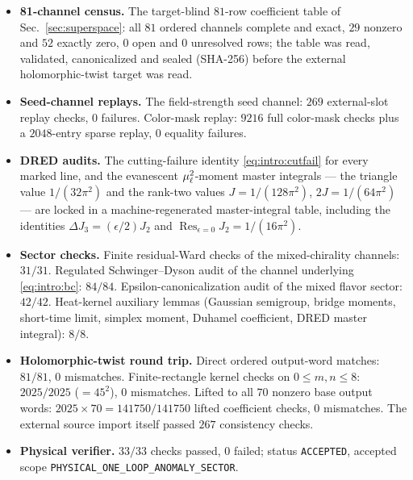 \begin{itemize}[leftmargin=1.6em]

\item \textbf{81-channel census.} The target-blind $81$-row coefficient table of Sec.~\ref{sec:superspace}: all $81$
ordered channels complete and exact, $29$ nonzero and $52$ exactly zero, $0$ open and $0$ unresolved rows; the table was
read, validated, canonicalized and sealed (SHA-256) before the external holomorphic-twist target was read.

\item \textbf{Seed-channel replays.} The field-strength seed channel: $269$ external-slot replay checks, $0$ failures.
Color-mask replay: $9216$ full color-mask checks plus a $2048$-entry sparse replay, $0$ equality failures.

\item \textbf{DRED audits.} The cutting-failure identity \eqref{eq:intro:cutfail} for every marked line, and the
evanescent $\mu_\ell^2$-moment master integrals --- the triangle value $1/(32\pi^2)$ and the rank-two values
$J=1/(128\pi^2)$, $2J=1/(64\pi^2)$ --- are locked in a machine-regenerated master-integral table, including the
identities $\Delta J_3=(\epsilon/2)J_2$ and $\operatorname*{Res}_{\epsilon=0}J_2=1/(16\pi^2)$.

\item \textbf{Sector checks.} Finite residual-Ward checks of the mixed-chirality channels: $31/31$. Regulated
Schwinger--Dyson audit of the channel underlying \eqref{eq:intro:bc}: $84/84$. Epsilon-canonicalization audit of the
mixed flavor sector: $42/42$. Heat-kernel auxiliary lemmas (Gaussian semigroup, bridge moments, short-time limit,
simplex moment, Duhamel coefficient, DRED master integral): $8/8$.

\item \textbf{Holomorphic-twist round trip.} Direct ordered output-word matches: $81/81$, $0$ mismatches.
Finite-rectangle kernel checks on $0\le m,n\le 8$: $2025/2025$ ($=45^2$), $0$ mismatches. Lifted to all $70$ nonzero
base output words: $2025\times70=141750/141750$ lifted coefficient checks, $0$ mismatches. The external source import
itself passed $267$ consistency checks.

\item \textbf{Physical verifier.} $33/33$ checks passed, $0$ failed; status \texttt{ACCEPTED}, accepted scope
\texttt{PHYSICAL\_ONE\_LOOP\_ANOMALY\_SECTOR}.

\end{itemize}

